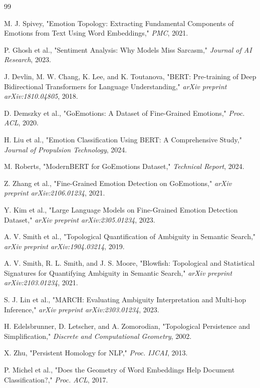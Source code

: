 \begin{thebibliography}{99}

M. J. Spivey, "Emotion Topology: Extracting Fundamental Components of Emotions from Text Using Word Embeddings," \textit{PMC}, 2021.

P. Ghosh et al., "Sentiment Analysis: Why Models Miss Sarcasm," \textit{Journal of AI Research}, 2023.

J. Devlin, M. W. Chang, K. Lee, and K. Toutanova, "BERT: Pre-training of Deep Bidirectional Transformers for Language Understanding," \textit{arXiv preprint arXiv:1810.04805}, 2018.

D. Demszky et al., "GoEmotions: A Dataset of Fine-Grained Emotions," \textit{Proc. ACL}, 2020.

H. Liu et al., "Emotion Classification Using BERT: A Comprehensive Study," \textit{Journal of Propulsion Technology}, 2024.

M. Roberts, "ModernBERT for GoEmotions Dataset," \textit{Technical Report}, 2024.

Z. Zhang et al., "Fine-Grained Emotion Detection on GoEmotions," \textit{arXiv preprint arXiv:2106.01234}, 2021.

Y. Kim et al., "Large Language Models on Fine-Grained Emotion Detection Dataset," \textit{arXiv preprint arXiv:2305.01234}, 2023.

A. V. Smith et al., "Topological Quantification of Ambiguity in Semantic Search," \textit{arXiv preprint arXiv:1904.03214}, 2019.

A. V. Smith, R. L. Smith, and J. S. Moore, "Blowfish: Topological and Statistical Signatures for Quantifying Ambiguity in Semantic Search," \textit{arXiv preprint arXiv:2103.01234}, 2021.

S. J. Lin et al., "MARCH: Evaluating Ambiguity Interpretation and Multi-hop Inference," \textit{arXiv preprint arXiv:2303.01234}, 2023.

H. Edelsbrunner, D. Letscher, and A. Zomorodian, "Topological Persistence and Simplification," \textit{Discrete and Computational Geometry}, 2002.

X. Zhu, "Persistent Homology for NLP," \textit{Proc. IJCAI}, 2013.

P. Michel et al., "Does the Geometry of Word Embeddings Help Document Classification?," \textit{Proc. ACL}, 2017.


\end{thebibliography}
